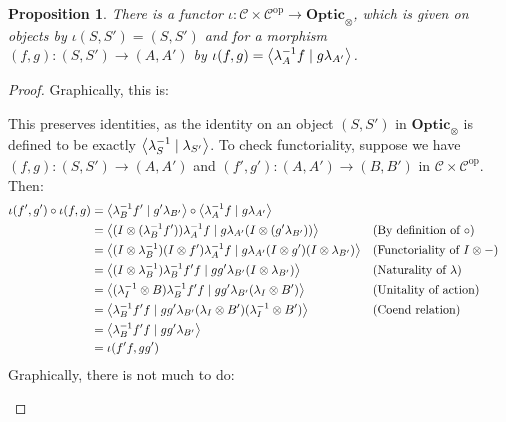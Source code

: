 \documentclass[11pt,letterpaper]{article}
\theoremstyle{plain}
\newtheorem{proposition}[theorem]{Proposition}
\theoremstyle{definition}
\newcommand{\C}{\mathscr{C}}
\newcommand{\Optic}{\mathbf{Optic}}
\newcommand{\op}{\mathrm{op}}
\newcommand{\rep}[2]{{\ensuremath \left\langle #1 \mid #2 \right\rangle}}
\begin{document}
\begin{proposition}
  There is a functor $\iota : \C \times \C^\op \to \Optic_\otimes$, which is given on objects by $\iota(S, S') = (S, S')$ and for a morphism $(f, g) : (S, S') \to (A, A')$ by $\iota(f, g) = \rep{\lambda_A^{-1} f}{g \lambda_{A'}}$.
\end{proposition}
\begin{proof}
  Graphically, this is:
  \begin{center}
    
  \end{center}

  This preserves identities, as the identity on an object $(S, S')$ in $\Optic_\otimes$ is defined to be exactly $\rep{\lambda^{-1}_S}{\lambda_{S'}}$. To check functoriality, suppose we have $(f, g) : (S, S') \to (A, A')$ and $(f', g') : (A, A') \to (B, B')$ in $\C \times \C^\op$. Then:
  \begin{align*}
    \iota(f', g') \circ \iota(f, g)
    &= \rep{\lambda^{-1}_B f'}{g' \lambda_{B'}} \circ \rep{\lambda^{-1}_A f}{g \lambda_{A'}} \\
    &= \rep{(I\otimes (\lambda^{-1}_B f'))\lambda^{-1}_A f}{g \lambda_{A'} (I\otimes (g' \lambda_{B'}))} && \text{(By definition of $\circ$)}\\
    &= \rep{(I \otimes \lambda^{-1}_B) (I \otimes f')\lambda^{-1}_A f}{g \lambda_{A'} (I \otimes g')(I\otimes \lambda_{B'})} && \text{(Functoriality of $I \otimes -$)}\\
    &= \rep{(I\otimes \lambda^{-1}_B) \lambda^{-1}_B f' f}{g g' \lambda_{B'} (I\otimes \lambda_{B'})} && \text{(Naturality of $\lambda$)}\\
    &= \rep{(\lambda^{-1}_I \otimes B) \lambda^{-1}_B f' f}{g g' \lambda_{B'} (\lambda_I \otimes B')} && \text{(Unitality of action)} \\
    &= \rep{\lambda^{-1}_B f' f}{g g' \lambda_{B'} (\lambda_I \otimes B') (\lambda^{-1}_I \otimes B')} && \text{(Coend relation)}  \\
    &= \rep{\lambda^{-1}_B f'f}{g g' \lambda_{B'}} \\
    &= \iota(f'f, gg')
  \end{align*}
  Graphically, there is not much to do:
  \begin{center}
    
    \qquad \raisebox{0.3cm}{$=$} \qquad
    
  \end{center}

\end{proof}
\end{document}
